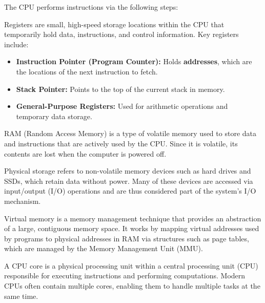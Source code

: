 \noindent
The CPU performs instructions via the following steps:
\begin{Def}

    Registers are small, high-speed storage locations within the CPU that temporarily hold data, instructions, and control information. Key registers include:
\begin{itemize}
    \item \textbf{Instruction Pointer (Program Counter):} Holds \textbf{addresses}, which are the locations of the next instruction to fetch.
    \item \textbf{Stack Pointer:} Points to the top of the current stack in memory.
    \item \textbf{General-Purpose Registers:} Used for arithmetic operations and temporary data storage.
\end{itemize}
\end{Def}


\newpage 
\begin{Def}

    RAM (Random Access Memory) is a type of volatile memory used to store data and instructions that are actively used by the CPU. Since it is volatile, its contents are lost when the computer is powered off.
\end{Def}

\begin{Def}

    Physical storage refers to non-volatile memory devices such as hard drives and SSDs, which retain data without power. Many of these devices are accessed via input/output (I/O) operations and are thus considered part of the system's I/O mechanism.
\end{Def}

\begin{Def}

    Virtual memory is a memory management technique that provides an abstraction of a large, contiguous memory space. It works by mapping virtual addresses used by programs to physical addresses in RAM via structures such as page tables, which are managed by the Memory Management Unit (MMU).
\end{Def}

    
\begin{Def}

    A CPU core is a physical processing unit within a central processing unit (CPU) responsible for executing instructions and performing computations. Modern CPUs often contain multiple cores, enabling them to handle multiple tasks at the same time. 
\end{Def}

